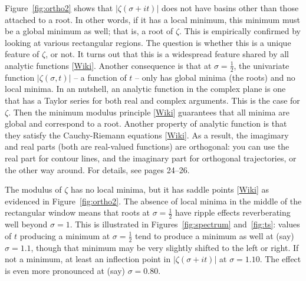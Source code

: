 \documentclass[oneside,10pt]{book}
\begin{document}
Figure~\ref{fig:ortho2} shows that $|\zeta(\sigma+it)|$ does not have basins other than those attached to a root. In other words, if it has a local minimum, this minimum must be a global minimum as well; that is, a root of $\zeta$. This is empirically confirmed by looking at various rectangular regions. The question is whether this is a unique feature of $\zeta$, or not. It turns out that this is a widespread feature shared  by all \textcolor{index}{analytic functions} [\href{https://en.wikipedia.org/wiki/Analytic_function}{Wiki}]. Another consequence is that at $\sigma=\frac{1}{2}$, the univariate function $|\zeta(\sigma,t)|$ -- a function of $t$ -- only has global minima (the roots) and no local minima. In an nutshell, an analytic function in the complex plane is one that has a Taylor series for both real and complex arguments. This is the case for $\zeta$. Then the  
\textcolor{index}{minimum modulus principle} [\href{https://en.wikipedia.org/wiki/Maximum_modulus_principle}{Wiki}] guarantees that all minima are global and correspond to a root. Another property of analytic function is
 that they satisfy the \textcolor{index}{Cauchy-Riemann equations} [\href{https://en.wikipedia.org/wiki/Cauchy\%E2\%80\%93Riemann_equations}{Wiki}]. As a result, the imagimary and real parts (both are real-valued functions) are orthogonal: you can use the real part for contour lines, and the imaginary part for orthogonal trajectories, or the other way around. For details, see
 \cite{conformalmap} pages 24--26.

The modulus of $\zeta$ has no local minima, but it has 
 \textcolor{index}{saddle points} [\href{https://en.wikipedia.org/wiki/Saddle_point}{Wiki}] as evidenced in Figure~\ref{fig:ortho2}. The absence of local minima in the middle of the rectangular window means that roots at $\sigma=\frac{1}{2}$ 
 have ripple effects reverberating well beyond $\sigma = 1$. This is illustrated in Figures~\ref{fig:spectrum} and~\ref{fig:ts}: values of
 $t$ producing a minimum at $\sigma=\frac{1}{2}$ tend to produce a minimum as well at (say) $\sigma=1.1$, though that minimum 
 may be very slightly shifted to the left or right. If not a minimum, at least an inflection point in $|\zeta(\sigma+it)|$ at $\sigma=1.10$. The effect is even more 
 pronounced at (say) $\sigma=0.80$. 
\end{document}
